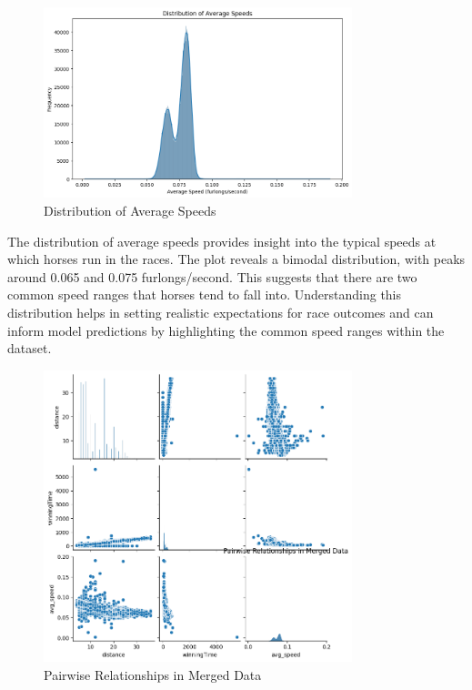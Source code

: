 \documentclass{article}
\begin{document}
\begin{figure}[H]
    \centering
    \includegraphics[width=0.8\textwidth]{images/distribution_avg_speeds.png} %
    \caption{Distribution of Average Speeds}
    \label{fig:distribution_average_speeds}
\end{figure}

The distribution of average speeds provides insight into the typical speeds at which horses run in the races. The plot reveals a bimodal distribution, with peaks around 0.065 and 0.075 furlongs/second. This suggests that there are two common speed ranges that horses tend to fall into. Understanding this distribution helps in setting realistic expectations for race outcomes and can inform model predictions by highlighting the common speed ranges within the dataset.

\begin{figure}[H]
    \centering
    \includegraphics[width=0.8\textwidth]{images/pairwise_relationships.png} %
    \caption{Pairwise Relationships in Merged Data}
    \label{fig:pairwise_relationships}
\end{figure}
\end{document}
